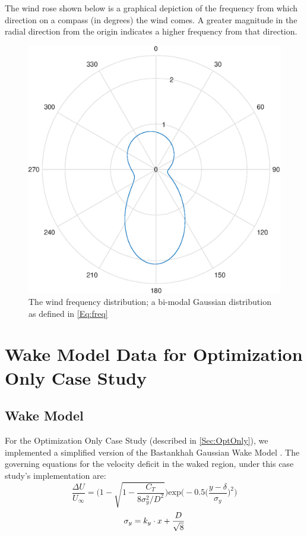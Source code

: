 \documentclass[12pt]{article}
\begin{document}
    The wind rose shown below is a graphical depiction of the frequency from which direction on a compass (in degrees) the wind comes. A greater magnitude in the radial direction from the origin indicates a higher frequency from that direction.
        \begin{figure}[H]
            \centering
            \includegraphics{WindRose.eps}
            \caption{The wind frequency distribution; a bi-modal Gaussian distribution as defined in \cref{Eq:freq}}
            \label{Fig:freq}
        \end{figure}

\newpage
\section{Wake Model Data for Optimization Only Case Study}\label{app:WakeModel}
\subsection{Wake Model}
    For the Optimization Only Case Study (described in \cref{Sec:OptOnly}), we implemented a simplified version of the Bastankhah Gaussian Wake Model \cite{Thomas2018}. The governing equations for the velocity deficit in the waked region, under this case study's implementation are:
    \begin{equation}
        \frac{\Delta U}{U_{\infty}}
        =
        \Bigg(
            1 - \sqrt{
                1 - \frac{C_T}
                    {8\sigma_{y}^{2}/D^2}
                }
        \Bigg)
                \text{exp}\bigg(
                    -0.5\Big(
                        \frac{y-\delta}{\sigma_{y}}
                    \Big)^2
                \bigg)
        \label{Eq:Bast}
    \end{equation}
    \begin{equation}
        \sigma_y = k_y\cdot x + \frac{D}{\sqrt{8}} \\
        \label{Eq:SigY}
    \end{equation}
    
\end{document}
